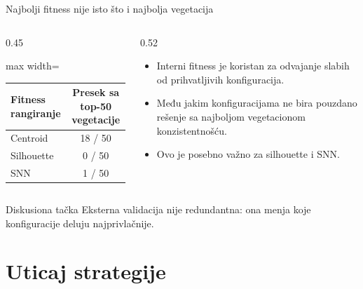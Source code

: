 \documentclass[aspectratio=169,10pt]{beamer}
\begin{document}
\begin{frame}{Najbolji fitness nije isto što i najbolja vegetacija}
  \begin{columns}[T]
    \begin{column}{0.45\textwidth}
      \begin{adjustbox}{max width=\textwidth}
      \begin{tabular}{lc}
        \toprule
        Fitness rangiranje & Presek sa top-50 vegetacije \\
        \midrule
        Centroid & 18 / 50 \\
        Silhouette & 0 / 50 \\
        SNN & 1 / 50 \\
        \bottomrule
      \end{tabular}
      \end{adjustbox}
    \end{column}
    \begin{column}{0.52\textwidth}
      \begin{itemize}
        \item Interni fitness je koristan za odvajanje slabih od prihvatljivih konfiguracija.
        \item Među jakim konfiguracijama ne bira pouzdano rešenje sa najboljom vegetacionom konzistentnošću.
        \item Ovo je posebno važno za silhouette i SNN.
      \end{itemize}
    \end{column}
  \end{columns}

  \vspace{1em}
  \begin{block}{Diskusiona tačka}
    Eksterna validacija nije redundantna: ona menja koje konfiguracije deluju najprivlačnije.
  \end{block}
\end{frame}

\section{Uticaj strategije}
\end{document}
